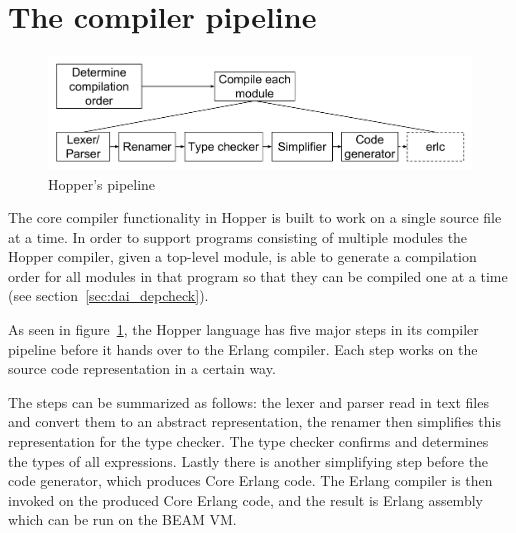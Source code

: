 \section{The compiler pipeline}



\begin{figure}[h!]
\centering
  \includegraphics[width=0.6\pdfpagewidth]{figure/pipeline}
  \caption{Hopper's pipeline}
  \label{fig:pipeline}
\end{figure}


The core compiler functionality in Hopper is built to work on a single source file at a time.
In order to support programs consisting of multiple modules the Hopper compiler,
given a top-level module, is able to generate a compilation order for all modules in that
program so that they can be compiled one at a time (see section~\ref{sec:dai_depcheck}).

As seen in figure~\ref{fig:pipeline}, the Hopper language has five major steps in its compiler
pipeline before it hands over to the Erlang compiler. Each step works on the 
source code representation in a certain way.

The steps can be summarized as follows: the lexer and parser read in text files and convert
them to an abstract representation, the renamer then simplifies this representation for the 
type checker. The type checker confirms and determines the types of all expressions. Lastly 
there is another simplifying step before the code generator, which produces Core
Erlang code. The Erlang compiler is then invoked on the produced Core Erlang
code, and the result is Erlang assembly which can be run on the BEAM VM.